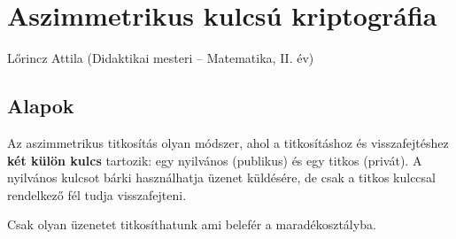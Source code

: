 
\chapter{Aszimmetrikus kulcsú kriptográfia}\label{chap:aszimmetrikus_kripto}
\begin{description}
{\large \item [{Szerző:}] Lőrincz Attila (Didaktikai mesteri -- Matematika, II.
év)}
\end{description}

\section*{Alapok}

Az aszimmetrikus titkosítás olyan módszer, ahol a titkosításhoz és
visszafejtéshez \textbf{két külön kulcs} tartozik: egy nyilvános (publikus)
és egy titkos (privát). A nyilvános kulcsot bárki használhatja üzenet
küldésére, de csak a titkos kulccsal rendelkező fél tudja visszafejteni.

Csak olyan üzenetet titkosíthatunk ami belefér a maradékosztályba.

